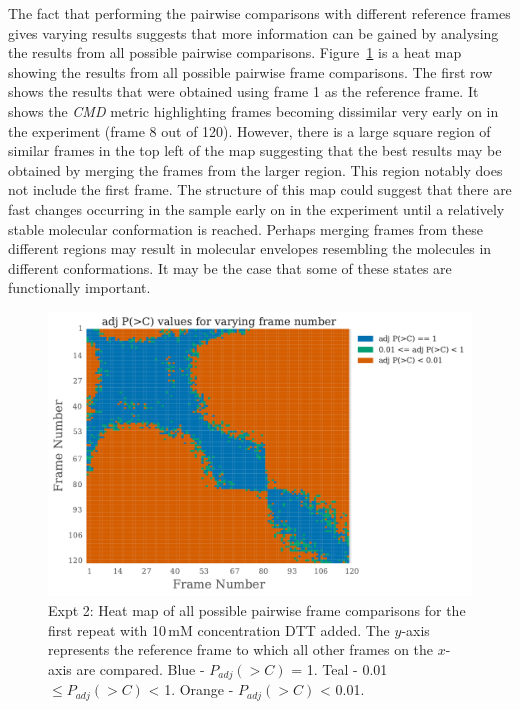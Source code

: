 The fact that performing the pairwise comparisons with different reference frames gives varying results suggests that more information can be gained by analysing the results from all possible pairwise comparisons.
Figure~\ref{fig:heatmap - DTT} is a heat map showing the results from all possible pairwise frame comparisons.
The first row shows the results that were obtained using frame 1 as the reference frame.
It shows the \textit{CMD} metric highlighting frames becoming dissimilar very early on in the experiment (frame 8 out of 120).
However, there is a large square region of similar frames in the top left of the map suggesting that the best results may be obtained by merging the frames from the larger region.
This region notably does not include the first frame.
The structure of this map could suggest that there are fast changes occurring in the sample early on in the experiment until a relatively stable molecular conformation is reached.
Perhaps merging frames from these different regions may result in molecular envelopes resembling the molecules in different conformations.
It may be the case that some of these states are functionally important.
\begin{figure}
    \centering
    \includegraphics[width=1.0\textwidth]{figures/saxs/dtt_heatmap.pdf}
    \caption[Heat map of all possible pairwise frame comparisons for the first repeat with 10\,mM concentration DTT added]{Expt 2: Heat map of all possible pairwise frame comparisons for the first repeat with 10\,mM concentration DTT added.
    The $y$-axis represents the reference frame to which all other frames on the $x$-axis are compared.
    Blue - $P_{adj}(>C)$ = 1. Teal - 0.01 $\le P_{adj}(>C)$ < 1. Orange - $P_{adj}(>C)$ < 0.01.}
    \label{fig:heatmap - DTT}
\end{figure}

